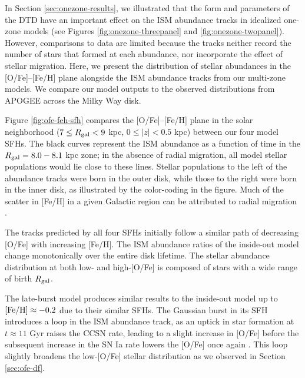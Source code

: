 \documentclass[twocolumn,twocolappendix,linenumbers]{aastex631}
\newcommand{\todo}[1]{{\color{red}#1}}
\begin{document}
In Section \ref{sec:onezone-results}, we illustrated that the form and parameters of the DTD have an important effect on the ISM abundance tracks in idealized one-zone models (see Figures \ref{fig:onezone-threepanel} and \ref{fig:onezone-twopanel}). However, comparisons to data are limited because the tracks neither record the number of stars that formed at each abundance, nor incorporate the effect of stellar migration. Here, we present the distribution of stellar abundances in the [O/Fe]--[Fe/H] plane alongside the ISM abundance tracks from our multi-zone models. We compare our model outputs to the observed distributions from APOGEE across the Milky Way disk.

Figure \ref{fig:ofe-feh-sfh} compares the [O/Fe]--[Fe/H] plane in the solar neighborhood ($7\leq R_{\rm gal}<9$ kpc, $0\leq|z|<0.5$ kpc) between our four model SFHs. The black curves represent the ISM abundance as a function of time in the $R_{\rm gal}=8.0-8.1$ kpc zone; in the absence of radial migration, all model stellar populations would lie close to these lines. Stellar populations to the left of the abundance tracks were born in the outer disk, while those to the right were born in the inner disk, as illustrated by the color-coding in the figure. 
Much of the scatter in [Fe/H] in a given Galactic region can be attributed to radial migration \citep{Edvardsson1993-ChemicalEvolution}.

The tracks predicted by all four SFHs initially follow a similar path of decreasing [O/Fe] with increasing [Fe/H]. The ISM abundance ratios of the inside-out model change monotonically over the entire disk lifetime. The stellar abundance distribution at both low- and high-[O/Fe] is composed of stars with a wide range of birth $R_{\rm gal}$. 

The late-burst model produces similar results to the inside-out model up to ${\rm [Fe/H]}\approx-0.2$ due to their similar SFHs. The Gaussian burst in its SFH introduces a loop in the ISM abundance track, as an uptick in star formation at $t\approx11$ Gyr raises the CCSN rate, leading to a slight increase in [O/Fe] before the subsequent increase in the SN Ia rate lowers the [O/Fe] once again \citep[see e.g. Figure 1 of][]{JohnsonWeinberg2020-Starbursts}. This loop slightly broadens the low-[O/Fe] stellar distribution as we observed in Section \ref{sec:ofe-df}.
\end{document}
